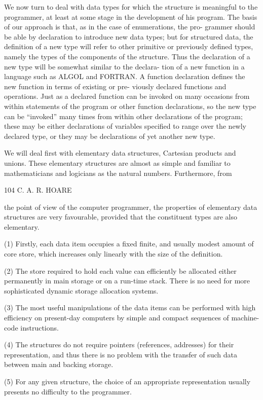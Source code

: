 We now turn to deal with data types for which the structure is meaningful to the programmer, at least at some stage in the development of his program. The basis of our approach is that, as in the case of enumerations, the pro- grammer should be able by declaration to introduce new data types; but for structured data, the definition of a new type will refer to other primitive or previously defined types, namely the types of the components of the structure. Thus the declaration of a new type will be somewhat similar to the declara- tion of a new function in a language such as ALGOL and FORTRAN. A function declaration defines the new function in terms of existing or pre- viously declared functions and operations. Just as a declared function can be invoked on many occasions from within statements of the program or other function declarations, so the new type can be “invoked” many times from within other declarations of the program; these may be either declarations of variables specified to range over the newly declared type, or they may be declarations of yet another new type.

We will deal first with elementary data structures, Cartesian products and unions. These elementary structures are almost as simple and familiar to mathematicians and logicians as the natural numbers. Furthermore, from

104 C. A. R. HOARE

the point of view of the computer programmer, the properties of elementary data structures are very favourable, provided that the constituent types are also elementary.

(1) Firstly, each data item occupies a fixed finite, and usually modest amount of core store, which increases only linearly with the size of the definition.

(2) The store required to hold each value can efficiently be allocated either permanently in main storage or on a run-time stack. There is no need for more sophisticated dynamic storage allocation systems.

(3) The most useful manipulations of the data items can be performed with high efficiency on present-day computers by simple and compact sequences of machine-code instructions.

(4) The structures do not require pointers (references, addresses) for their representation, and thus there is no problem with the transfer of such data between main and backing storage.

(5) For any given structure, the choice of an appropriate representation usually presents no difficulty to the programmer.

